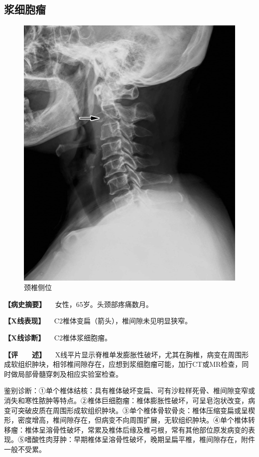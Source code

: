 \subsection{浆细胞瘤}

\begin{figure}[!htbp]
 \centering
 \includegraphics{./images/Image00103.jpg}
 \captionsetup{justification=centering}
 \caption{颈椎侧位}
 \label{fig2-7-18}
  \end{figure} 

\textbf{【病史摘要】} 　女性，65岁。头颈部疼痛数月。

\textbf{【X线表现】} 　C2椎体变扁（箭头），椎间隙未见明显狭窄。

\textbf{【X线诊断】} 　C2椎体浆细胞瘤。

\textbf{【评　　述】}
　X线平片显示脊椎单发膨胀性破坏，尤其在胸椎，病变在周围形成软组织肿块，相邻椎间隙存在，应想到浆细胞瘤可能，加行CT或MR检查，同时做局部骨髓穿刺及相应实验室检查。

鉴别诊断：①单个椎体结核：具有椎体破坏变扁、可有沙粒样死骨、椎间隙变窄或消失和寒性脓肿等特点。②椎体巨细胞瘤：椎体膨胀性破坏，可呈皂泡状改变，病变可突破皮质在周围形成软组织肿块。③单个椎体骨软骨炎：椎体压缩变扁或呈楔形，密度增高，椎间隙存在，但病变不向周围扩展，无软组织肿块。④单个椎体转移瘤：椎体呈溶骨性破坏，常累及椎体后缘及椎弓根，常有其他部位原发病变的表现。⑤嗜酸性肉芽肿：早期椎体呈溶骨性破坏，晚期呈扁平椎，椎间隙存在，附件一般不受累。

